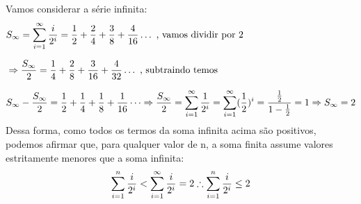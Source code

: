 Vamos considerar a série infinita:
\begin{equation*}
  \setlength{\jot}{10pt}
  \begin{aligned}
    &S_\infty = \sum^{\infty}_{i=1} \frac{i}{2^i} = \frac{1}{2} + \frac{2}{4} + \frac{3}{8} + \frac{4}{16} \dots \text{ , vamos dividir por 2} \\
    &\Rightarrow \frac{S_\infty}{2} = \frac{1}{4} + \frac{2}{8} + \frac{3}{16} + \frac{4}{32} \dots \text{ , subtraindo temos } \\
    &S_\infty - \frac{S_\infty}{2} = \frac{1}{2} + \frac{1}{4} + \frac{1}{8} + \frac{1}{16} \dots \Rightarrow \frac{S_\infty}{2} = \sum^{\infty}_{i=1} \frac{1}{2^i} = \sum^{\infty}_{i=1} (\frac{1}{2})^i = \frac{\frac{1}{2}}{1-\frac{1}{2}} = 1 \Rightarrow S_\infty = 2 \\
  \end{aligned}\end{equation*}
  Dessa forma, como todos os termos da soma infinita acima são positivos, podemos afirmar que, para qualquer valor de n, a soma finita assume valores estritamente menores que a soma infinita:
  \begin{equation*}
    \setlength{\jot}{10pt}
    \begin{aligned}
      \sum^{n}_{i=1} \frac{i}{2^i} < \sum^{\infty}_{i=1} \frac{i}{2^i} = 2 \therefore \sum^{n}_{i=1} \frac{i}{2^i} \leq 2
\end{aligned}\end{equation*}
